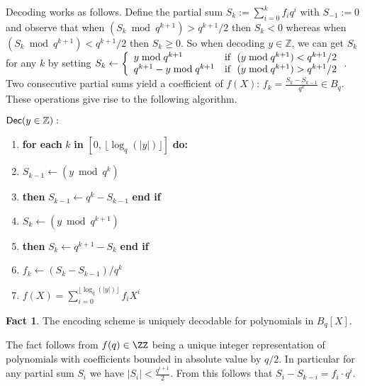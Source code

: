 \documentclass{article}
\theoremstyle{definition}
\newtheorem{fact}{Fact}
\begin{document}
Decoding works as follows. Define the partial sum $S_k := \sum_{i=0}^k f_i q^i$ with $S_{-1} := 0$ and observe that when $(S_k \bmod q^{k+1}) > q^{k+1}/2$ then $S_k < 0$ whereas when $(S_k \bmod q^{k+1}) < q^{k+1}/2$ then $S_k \geq 0$. So when decoding $y \in \mathbb{Z}$, we can get $S_k$ for any $k$ by setting $S_k \gets \left\{ \begin{array}{ll}
y \bmod q^{k+1} & \textnormal{if } \ (y \bmod q^{k+1}) < q^{k+1}/2 \\
q^{k+1} - y \bmod q^{k+1} & \textnormal{if } \ (y \bmod q^{k+1}) > q^{k+1}/2 \\
\end{array} \right.$. Two consecutive partial sums yield a coefficient of $f(X)$: $f_k = \frac{S_{k} - S_{k-1}}{q^{k}} \in B_q$. These operations give rise to the following algorithm.
\begin{mdframed}
\begin{flushleft}
	$\textsf{{Dec}}(y \in \mathbb{Z}):$
	\begin{enumerate}[nolistsep]
	    \item \textbf{for each} $k$ \textbf{in} $[0, \, \lfloor \log_q(|y|)\rfloor]$ \textbf{do:}\\
		\item \pcind[1] $S_{k-1} \gets (y \bmod q^{k})$
		\item \pcind[1]  \textbf{then} $S_{k-1} \gets q^{k}-S_{k-1}$ \textbf{end if}
		\item \pcind[1] $S_k \gets (y \bmod q^{k+1})$
		\item \pcind[1]  \textbf{then} $S_{k} \gets q^{k+1}-S_{k}$ \textbf{end if}
		\item \pcind[1] $f_k \gets (S_{k} - S_{k-1}) / q^k$
		\item \pcreturn $f(X) = \sum_{i=0}^{\lfloor \log_q(|y|)\rfloor} f_i X^i$
	\end{enumerate} 
\end{flushleft}
\end{mdframed}

\begin{fact}
	The encoding scheme is uniquely decodable for polynomials in $B_{q}[X]$.
\end{fact}
The fact follows from $f(q)\in \ZZ$ being a unique integer representation of polynomials with coefficients bounded in absolute value by $q/2$. In particular for any partial sum $S_i$ we have $|S_i|<\frac{q^{i+1}}{2}$. From this follows that $S_i-S_{k-i}=f_i \cdot q^i$.  
\end{document}

